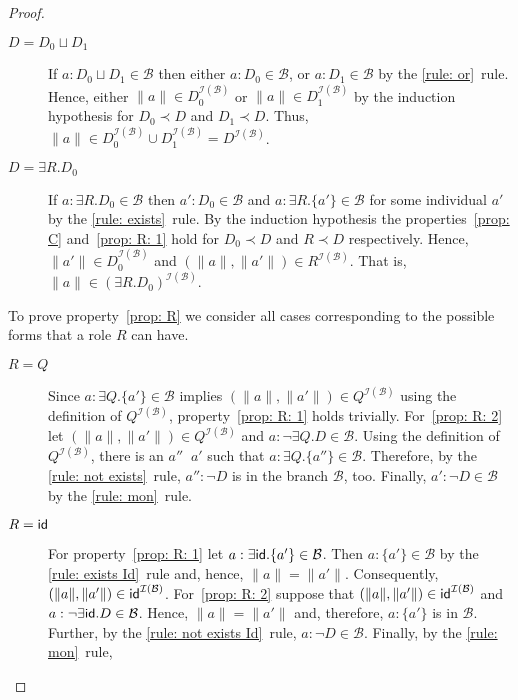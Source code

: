 \documentclass[leqno
,pdflatex
,prodmode
,acmtocl
]{acmsmall}
\newcommand{\mathcmd}[1]{\ensuremath{#1}\xspace}
\newcommand{\idRole}{\mathcmd{\textsf{\upshape\mdseries id}}}
\def\Not{\neg}
\def\Or{\sqcup}
\newcommand{\ecl}[1]{\|#1\|}
\newcommand{\branch}[1]{\seg{#1}}
\newcommand{\seg}[1]{\mathcmd{\mathcal{#1}}}
\newcommand{\indiv}{a}
\newcommand{\rname}{Q}
\newcommand{\I}{\mathcal{I}}
\newcommand{\simB}{\mathop{\sim_\branch{B}}}
\newcommand{\IB}{{\I(\branch{B})}}
\begin{document}
\begin{proof}
\begin{description}
 \item[$D=D_0\Or D_1$]
    If $\indiv:D_0\Or D_1\in\branch{B}$ then either $\indiv:D_0\in\branch{B}$, or $\indiv:D_1\in\branch{B}$
    by the \eqref{rule: or}~rule.
    Hence, either $\|\indiv\|\in D_0^\IB$ or $\|\indiv\|\in D_1^\IB$ by the induction hypothesis for
    $D_0\prec D$ and $D_1\prec D$.
    Thus, $\|\indiv\|\in D_0^\IB\cup D_1^\IB=D^\IB$.
 \item[$D=\exists R.D_0$]
    If $\indiv:\exists R.D_0\in\branch{B}$ then $\indiv':D_0\in\branch{B}$ and $\indiv:\exists R.\{\indiv'\}\in\branch{B}$ 
    for some individual $\indiv'$ by the \eqref{rule: exists}~rule. 
    By the induction hypothesis the properties~\eqref{prop: C} and~\eqref{prop: R: 1} hold for $D_0\prec D$
    and $R\prec D$ respectively. 
    Hence,
    $\|\indiv'\|\in D_0^\IB$ and $(\|\indiv\|,\|\indiv'\|)\in R^\IB$. That is, $\|\indiv\|\in(\exists R.D_0)^\IB$.
\end{description}
To prove property~\eqref{prop: R} we consider all cases corresponding to the possible forms that a role $R$ can have.
\begin{description}
 \item[$R=\rname$]
    Since $\indiv:\exists \rname.\{\indiv'\}\in\branch{B}$ implies $(\|\indiv\|,\|\indiv'\|)\in \rname^\IB$
    using the definition of $\rname^\IB$, property~\eqref{prop: R: 1} holds trivially.
    For~\eqref{prop: R: 2} let $(\|\indiv\|,\|\indiv'\|)\in \rname^\IB$ and $\indiv:\Not\exists \rname.D\in\branch{B}$.
    Using the definition of $\rname^\IB$, there is an $\indiv''\simB\indiv'$ such that $\indiv:\exists \rname.\{\indiv''\}\in\branch{B}$.
    Therefore, by the \eqref{rule: not exists}~rule, $\indiv'':\Not D$ is in the branch $\branch{B}$, too.
    Finally, $\indiv':\Not D\in\branch{B}$ by the \eqref{rule: mon}~rule.
 \item[$R=\idRole$] For property~\eqref{prop: R: 1} let $\indiv:\exists \idRole.\{\indiv'\}\in\branch{B}$.
                    Then $\indiv:\{\indiv'\}\in\branch{B}$ by the \eqref{rule: exists Id}~rule and, hence, $\ecl{\indiv}=\ecl{\indiv'}$.
                    Consequently, $(\|\indiv\|,\|\indiv'\|)\in\idRole^\IB$.
For~\eqref{prop: R: 2} suppose that 
                    $(\|\indiv\|,\|\indiv'\|)\in \idRole^\IB$ and $\indiv:\Not\exists \idRole.D\in\branch{B}$.
                    Hence, $\ecl{\indiv}=\ecl{\indiv'}$ and, therefore, $\indiv:\{\indiv'\}$ is in $\branch{B}$.
                    Further, by the \eqref{rule: not exists Id}~rule,
                     $\indiv:\Not D\in\branch{B}$.
                    Finally, by the \eqref{rule: mon}~rule, 

\end{description}
\end{proof}
\end{document}
